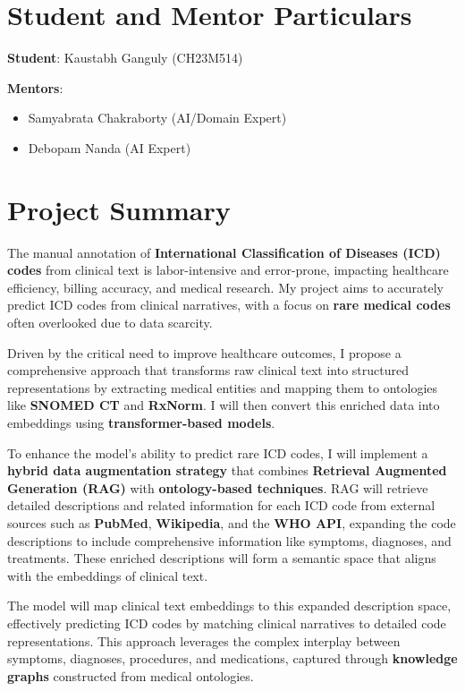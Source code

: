\documentclass[10pt,a4paper]{article}
\begin{document}
\section{Student and Mentor Particulars}
\textbf{Student}: Kaustabh Ganguly (CH23M514)

\textbf{Mentors}: 
\begin{itemize}
    \item Samyabrata Chakraborty (AI/Domain Expert)
    \item Debopam Nanda (AI Expert)
\end{itemize}

\section{Project Summary}
The manual annotation of \textbf{International Classification of Diseases (ICD) codes} from clinical text is labor-intensive and error-prone, impacting healthcare efficiency, billing accuracy, and medical research. My project aims to accurately predict ICD codes from clinical narratives, with a focus on \textbf{rare medical codes} often overlooked due to data scarcity.

Driven by the critical need to improve healthcare outcomes, I propose a comprehensive approach that transforms raw clinical text into structured representations by extracting medical entities and mapping them to ontologies like \textbf{SNOMED CT} and \textbf{RxNorm}. I will then convert this enriched data into embeddings using \textbf{transformer-based models}.

To enhance the model's ability to predict rare ICD codes, I will implement a \textbf{hybrid data augmentation strategy} that combines \textbf{Retrieval Augmented Generation (RAG)} with \textbf{ontology-based techniques}. RAG will retrieve detailed descriptions and related information for each ICD code from external sources such as \textbf{PubMed}, \textbf{Wikipedia}, and the \textbf{WHO API}, expanding the code descriptions to include comprehensive information like symptoms, diagnoses, and treatments. These enriched descriptions will form a semantic space that aligns with the embeddings of clinical text.

The model will map clinical text embeddings to this expanded description space, effectively predicting ICD codes by matching clinical narratives to detailed code representations. This approach leverages the complex interplay between symptoms, diagnoses, procedures, and medications, captured through \textbf{knowledge graphs} constructed from medical ontologies.
\end{document}
